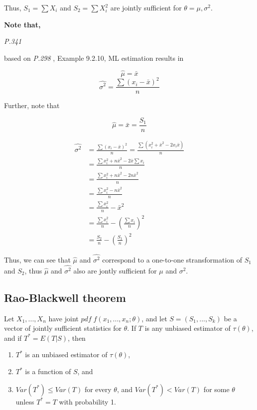 \documentclass[]{book}
\begin{document}
Thus, \(S_1=\sum X_i\) and \(S_2=\sum X_i^2\) are jointly sufficient for \(\theta={\mu, \sigma^2}\).

\textbf{Note that,}

\emph{P.341}

based on \emph{P.298} , Example 9.2.10, ML estimation results in

\[\hat{\mu}=\bar{x}\]
\[\hat{\sigma^2}=\frac{\sum(x_i-\bar{x})^2}{n}\]

Further, note that

\[\hat{\mu}=\bar{x}=\frac{S_1}{n}\]

\[\begin{aligned} \hat{\sigma^2}&=\frac{\sum(x_i-\bar{x})^2}{n}=\frac{\sum (x_i^2+\bar{x}^2-2x_i\bar{x})}{n} \\ &=\frac{\sum x_i^2+n\bar{x}^2-2\bar{x} \sum x_i}{n} \\ &=\frac{\sum x_i^2+n\bar{x}^2-2n\bar{x}^2}{n} \\&=\frac{\sum x_i^2-n\bar{x}^2}{n} \\&=\frac{\sum x_i^2}{n}-\bar{x}^2 \\ &=\frac{\sum x_i^2}{n}- (\frac{\sum x_i}{n})^2 \\ &=\frac{S_2}{n}-(\frac{S_1}{n})^2 \end{aligned}\]

Thus, we can see that \(\hat{\mu}\) and \(\hat{\sigma^2}\) correspond to a one-to-one stransformation of \(S_1\) and \(S_2\), thus \(\hat{\mu}\) and \(\hat{\sigma^2}\) also are jontly sufficient for \(\mu\) and \(\sigma^2\).

\hypertarget{rao-blackwell-theorem}{%
\subsection{Rao-Blackwell theorem}\label{rao-blackwell-theorem}}

Let \(X_1,...,X_n\) have joint \(pdf \; f(x_1,...,x_n; \theta)\), and let \(S=(S_1,...,S_k)\) be a vector of jointly sufficient statistics for \(\theta\). If \(T\) is any unbiased estimator of \(\tau(\theta)\), and if \(T^*=E(T|S)\), then

\begin{enumerate}
\def\labelenumi{(\arabic{enumi})}
\item
  \(T^*\) is an unbiased estimator of \(\tau(\theta)\),
\item
  \(T^*\) is a function of \(S\), and
\item
  \(Var(T^*) \leq Var(T)\) for every \(\theta\), and \(Var(T^*) < Var(T)\) for some \(\theta\) unless \(T^*=T\) with probability 1.
\end{enumerate}
\end{document}
